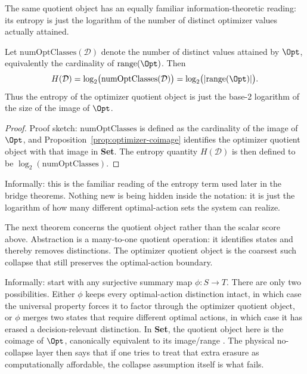 The same quotient object has an equally familiar information-theoretic reading: its entropy is just the logarithm of the number of distinct optimizer values actually attained.

\begin{proposition}\label{prop:optimizer-entropy-image}
Let $\mathrm{numOptClasses}(\mathcal{D})$ denote the number of distinct values attained by $\Opt$, equivalently the cardinality of $\mathrm{range}(\Opt)$. Then
\[
H(\mathcal{D}) = \log_2\bigl(\mathrm{numOptClasses}(\mathcal{D})\bigr)
=
\log_2\bigl(|\mathrm{range}(\Opt)|\bigr).
\]
Thus the entropy of the optimizer quotient object is just the base-2 logarithm of the size of the image of $\Opt$.
\end{proposition}

\begin{proof}
Proof sketch: $\mathrm{numOptClasses}$ is defined as the cardinality of the image of $\Opt$, and Proposition~\ref{prop:optimizer-coimage} identifies the optimizer quotient object with that image in \textbf{Set}. The entropy quantity $H(\mathcal{D})$ is then defined to be $\log_2(\mathrm{numOptClasses})$.
\end{proof}

Informally: this is the familiar reading of the entropy term used later in the bridge theorems. Nothing new is being hidden inside the notation: it is just the logarithm of how many different optimal-action sets the system can realize.

The next theorem concerns the quotient object rather than the scalar score above. Abstraction is a many-to-one quotient operation: it identifies states and thereby removes distinctions. The optimizer quotient object is the coarsest such collapse that still preserves the optimal-action boundary.

Informally: start with any surjective summary map $\phi : S \to T$. There are only two possibilities. Either $\phi$ keeps every optimal-action distinction intact, in which case the universal property forces it to factor through the optimizer quotient object, or $\phi$ merges two states that require different optimal actions, in which case it has erased a decision-relevant distinction. In \textbf{Set}, the quotient object here is the coimage of $\Opt$, canonically equivalent to its image/range \cite{maclane1998categories}. The physical no-collapse layer then says that if one tries to treat that extra erasure as computationally affordable, the collapse assumption itself is what fails.

